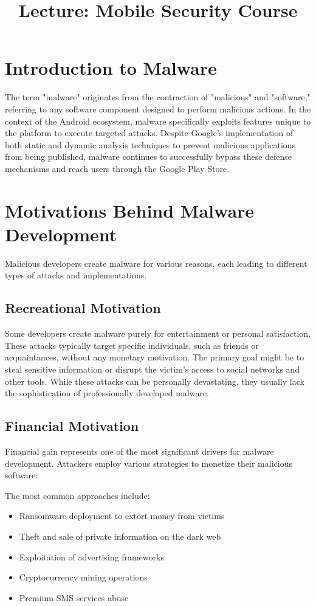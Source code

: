 \documentclass{article}
\title{Lecture: Mobile Security Course}
\author{}
\date{}
\begin{document}
\maketitle

\section{Introduction to Malware}
The term "malware" originates from the contraction of "malicious" and "software," referring to any software component designed to perform malicious actions. In the context of the Android ecosystem, malware specifically exploits features unique to the platform to execute targeted attacks. Despite Google's implementation of both static and dynamic analysis techniques to prevent malicious applications from being published, malware continues to successfully bypass these defense mechanisms and reach users through the Google Play Store.

\section{Motivations Behind Malware Development}
Malicious developers create malware for various reasons, each leading to different types of attacks and implementations.

\subsection{Recreational Motivation}
Some developers create malware purely for entertainment or personal satisfaction. These attacks typically target specific individuals, such as friends or acquaintances, without any monetary motivation. The primary goal might be to steal sensitive information or disrupt the victim's access to social networks and other tools. While these attacks can be personally devastating, they usually lack the sophistication of professionally developed malware.

\subsection{Financial Motivation}
Financial gain represents one of the most significant drivers for malware development. Attackers employ various strategies to monetize their malicious software:

The most common approaches include:
\begin{itemize}
    \item Ransomware deployment to extort money from victims
    \item Theft and sale of private information on the dark web
    \item Exploitation of advertising frameworks
    \item Cryptocurrency mining operations
    \item Premium SMS services abuse
\end{itemize}
\end{document}
